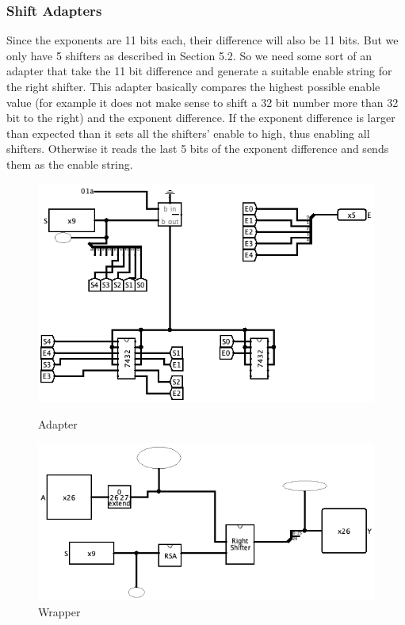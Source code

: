 \documentclass{article}
\begin{document}
\subsubsection{\textbf{Shift Adapters}}
Since the exponents are 11 bits each, their difference will also be 11 bits. But
we only have 5 shifters as described in Section 5.2. So we need some sort of an
adapter that take the 11 bit difference and generate a suitable enable string for
the right shifter. This adapter basically compares the highest possible enable
value (for example it does not make sense to shift a 32 bit number more than
32 bit to the right) and the exponent difference. If the exponent difference is
larger than expected than it sets all the shifters’ enable to high, thus enabling all shifters. Otherwise it reads the last 5 bits of the exponent difference and
sends them as the enable string.
\pagebreak 
\begin{figure}[h]
    \centering
    \begin{minipage}{0.45\textwidth}
        \centering
        \includegraphics[width=\textwidth]{adapter} %
        \caption{Adapter}
        \label{fig:image1}
    \end{minipage}\hfill
    \begin{minipage}{0.45\textwidth}
        \centering
        \includegraphics[width=\textwidth]{wrapper} %
        \caption{Wrapper}
        \label{fig:image2}
    \end{minipage}
\end{figure}
\end{document}
